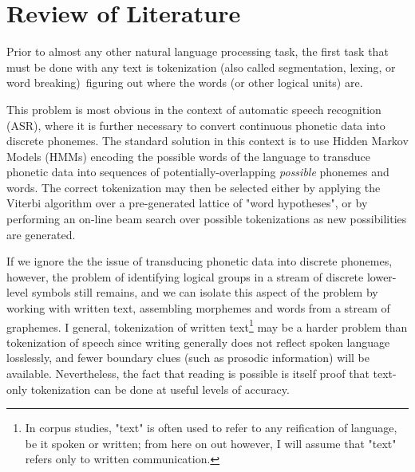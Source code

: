 \chapter{Review of Literature}

Prior to almost any other natural language processing task, the first task that must be done with any text is tokenization (also called segmentation, lexing, or word breaking)\textemdash~figuring out where the words (or other logical units) are. 

This problem is most obvious in the context of automatic speech recognition (ASR), where it is further necessary to convert continuous phonetic data into discrete phonemes. The standard solution in this context is to use Hidden Markov Models (HMMs) encoding the possible words of the language to transduce phonetic data into sequences of potentially-overlapping \textit{possible} phonemes and words\cite{varile97}. The correct tokenization may then be selected either by applying the Viterbi algorithm over a pre-generated lattice of "word hypotheses"\cite{aubert94}, or by performing an on-line beam search over possible tokenizations as new possibilities are generated\cite{paul94}.


If we ignore the the issue of transducing phonetic data into discrete phonemes, however, the problem of identifying logical groups in a stream of discrete lower-level symbols still remains, and we can isolate this aspect of the problem by working with written text, assembling morphemes and words from a stream of graphemes. I general, tokenization of written text\footnote{In corpus studies, "text" is often used to refer to any reification of language, be it spoken or written; from here on out however, I will assume that "text" refers only to written communication.} may be a harder problem than tokenization of speech since writing generally does not reflect spoken language losslessly, and fewer boundary clues (such as prosodic information) will be available. Nevertheless, the fact that reading is possible is itself proof that text-only tokenization can be done at useful levels of accuracy.

